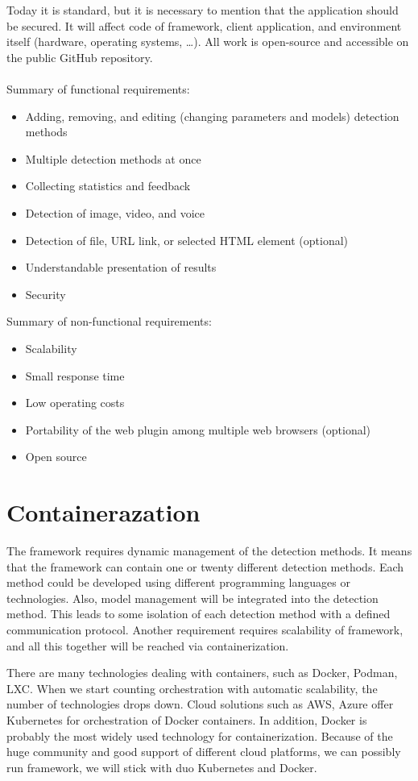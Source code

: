 Today it is standard, but it is necessary to mention that the application should be secured. It will affect code of framework, client application, and environment itself (hardware, operating systems, …). All work is open-source and accessible on the public GitHub repository.
\\\\
\noindent Summary of functional requirements:
\begin{itemize}
\item Adding, removing, and editing (changing parameters and models) detection methods
\item Multiple detection methods at once
\item Collecting statistics and feedback
\item Detection of image, video, and voice
\item Detection of file, URL link, or selected HTML element (optional)
\item Understandable presentation of results
\item Security
\end{itemize}

\noindent Summary of non-functional requirements:
\begin{itemize}
\item Scalability
\item Small response time
\item Low operating costs
\item Portability of the web plugin among multiple web browsers (optional)
\item Open source
\end{itemize}

\section{Containerazation}

The framework requires dynamic management of the detection methods. It means that the framework can contain one or twenty different detection methods. Each method could be developed using different programming languages or technologies. Also, model management will be integrated into the detection method. This leads to some isolation of each detection method with a defined communication protocol. Another requirement requires scalability of framework, and all this together will be reached via containerization.

There are many technologies dealing with containers, such as Docker, Podman, LXC. When we start counting orchestration with automatic scalability, the number of technologies drops down. Cloud solutions such as AWS, Azure offer Kubernetes for orchestration of Docker containers. In addition, Docker is probably the most widely used technology for containerization. Because of the huge community and good support of different cloud platforms, we can possibly run framework, we will stick with duo Kubernetes and Docker.

